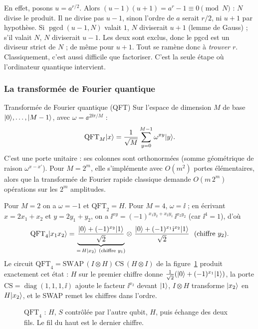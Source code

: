 En effet, posons $u=a^{r/2}$. Alors $(u-1)(u+1)=a^r-1\equiv0\pmod N$ : $N$ divise le produit. Il ne
divise pas $u-1$, sinon l'ordre de $a$ serait $r/2$, ni $u+1$ par hypothèse. Si $\operatorname{pgcd}(u-1,N)$
valait $1$, $N$ diviserait $u+1$ (lemme de Gauss) ; s'il valait $N$, $N$ diviserait $u-1$. Les deux sont exclus, donc
le pgcd est un diviseur strict de $N$ ; de même pour $u+1$. Tout se ramène donc à \emph{trouver $r$}. Classiquement, c'est
aussi difficile que factoriser. C'est la seule étape où l'ordinateur quantique intervient.

\subsubsection{La transformée de Fourier quantique}

\begin{definition}{Transformée de Fourier quantique (QFT)}
Sur l'espace de dimension $M$ de base $|0\rangle,\ldots,|M-1\rangle$, avec $\omega=\ee^{2\ii\pi/M}$ :
\[
  \mathrm{QFT}_M|x\rangle=\frac{1}{\sqrt M}\sum_{y=0}^{M-1}\omega^{xy}|y\rangle.
\]
C'est une porte unitaire : ses colonnes sont orthonormées (somme géométrique de raison $\omega^{x-x'}$).
Pour $M=2^m$, elle s'implémente avec $O(m^2)$ portes élémentaires, alors que la transformée de Fourier
rapide classique demande $O(m\,2^m)$ opérations sur les $2^m$ amplitudes.
\end{definition}

Pour $M=2$ on a $\omega=-1$ et $\mathrm{QFT}_2=H$. Pour $M=4$, $\omega=\ii$ ; en écrivant $x=2x_1+x_2$ et
$y=2y_1+y_2$, on a $\ii^{xy}=(-1)^{x_1y_2+x_2y_1}\,\ii^{x_2y_2}$ (car $\ii^4=1$), d'où
\[
  \mathrm{QFT}_4\ket{x_1x_2}=\underbrace{\frac{\ket0+(-1)^{x_2}\ket1}{\sqrt2}}_{=\,H\ket{x_2}\ \text{(chiffre }y_1)}
  \otimes\ \frac{\ket0+(-1)^{x_1}\ii^{x_2}\ket1}{\sqrt2}\ \ \text{(chiffre }y_2).
\]
Le circuit $\mathrm{QFT}_4=\mathrm{SWAP}\,(I\otimes H)\,\mathrm{CS}\,(H\otimes I)$ de la
figure~\ref{fig:qft4} produit exactement cet état : $H$ sur le premier chiffre donne
$\frac{1}{\sqrt2}(|0\rangle+(-1)^{x_1}|1\rangle)$, la porte $\mathrm{CS}=\operatorname{diag}(1,1,1,\ii)$ ajoute le
facteur $\ii^{x_2}$ devant $|1\rangle$, $I\otimes H$ transforme $|x_2\rangle$ en $H|x_2\rangle$, et le SWAP remet les
chiffres dans l'ordre.

\begin{figure}[!ht]
\centering
{}
\caption{$\mathrm{QFT}_4$ : $H$, $S$ contrôlée par l'autre qubit, $H$, puis échange des deux fils.
Le fil du haut est le dernier chiffre.}
\label{fig:qft4}
\end{figure}


